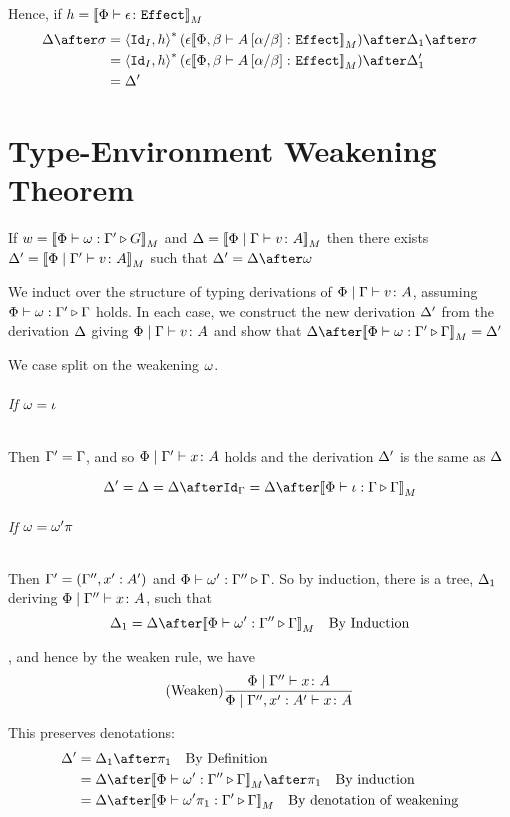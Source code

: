\documentclass{report}
\begin{document}
Hence, if $h = {\bf [\![}\Phi \vdash \epsilon \colon \texttt{Effect}{\bf ]\!]}_M$
\begin{align}
    \D\after\si &= \pr{\Id{I}}{h}\star(\e{\deno{\typerelation{\P,\b}{A\ssub{\b}{\a}}{\effect}}})\after\D_1\after\si\\
    &= \pr{\Id{I}}{h}\star(\e{\deno{\typerelation{\P,\b}{A\ssub{\b}{\a}}{\effect}}})\after\D_1'\\
    & = \D'
\end{align}

\chapter{Type-Environment Weakening Theorem}

If $w = {\bf [\![}\Phi\vdash \omega : \Gamma' \triangleright G{\bf ]\!]}_M$ and $\Delta = {\bf [\![}\Phi\mid\Gamma \vdash v \colon A{\bf ]\!]}_M$ then there exists $\Delta' = {\bf [\![}\Phi\mid\Gamma' \vdash v \colon A{\bf ]\!]}_M$ such that $\D' = \D\after\w$

\proof
We induct over the structure of typing derivations of $\Phi\mid\Gamma \vdash v \colon A$, assuming $\Phi\vdash \omega : \Gamma' \triangleright \Gamma$ holds. In each case, we construct the new derivation $\Delta'$ from the derivation $\Delta$ giving $\Phi\mid\Gamma \vdash v \colon A$ and show that $\D\after\deno{\ewrel{\P}{\w}{\G'}{\G}} = \D'$

        We case split on the weakening $\omega$.
        \subparagraph{If $\omega = \iota$}
        Then $\Gamma' = \Gamma$, and so $\Phi\mid\Gamma' \vdash x \colon A$ holds and the derivation $\Delta'$ is the same as $\Delta$

        \begin{equation}
            \D' = \D = \D\after\idg = \D\after\deno{\ewrel{\P}{\i}{\G}{\G}} 
        \end{equation}
        \subparagraph{If $\omega = \omega'\pi$}
        Then  $\Gamma' = (\Gamma'',x': A')$ and $\Phi\vdash \omega' : \Gamma'' \triangleright \Gamma$. So by induction, there is a tree, $\Delta_1$ deriving $\Phi\mid\Gamma'' \vdash x \colon A$,  such that 
        \begin{equation}
            \D_1 = \D\after\deno{\ewrel{\P}{\w'}{\G''}{\G}} \qt{By Induction}
        \end{equation}
        
        , and hence by the weaken rule, we have 
        \begin{equation}
            (\text{Weaken}) \frac{\Phi\mid\Gamma'' \vdash x \colon A}{\Phi\mid\Gamma'', x':A'  \vdash x \colon A}
        \end{equation}

        This preserves denotations:
        \begin{align}
            \D' & = \D_1\after\p\qt{By Definition} \\
            & = \D\after\deno{\ewrel{\P}{\w'}{\G''}{\G}}\after\p\qt{By induction}\\
            & = \D\after\deno{\ewrel{\P}{\w'\p}{\G'}{\G}}\qt{By denotation of weakening}
        \end{align}
\end{document}
